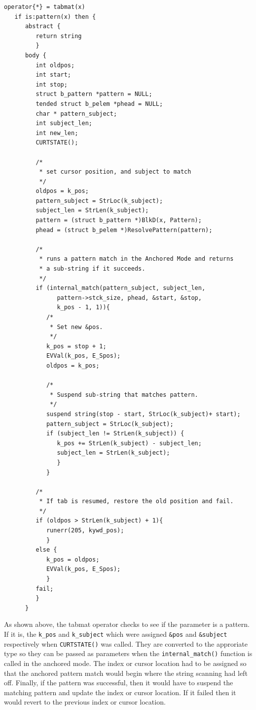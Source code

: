 \documentclass{article}
\begin{document}
\begin{verbatim}
operator{*} = tabmat(x)
   if is:pattern(x) then {
      abstract {
         return string
         }
      body {
         int oldpos;
         int start;
         int stop;
         struct b_pattern *pattern = NULL;
         tended struct b_pelem *phead = NULL; 
         char * pattern_subject;
         int subject_len;
         int new_len;
         CURTSTATE();
         
         /*
          * set cursor position, and subject to match
          */
         oldpos = k_pos;
         pattern_subject = StrLoc(k_subject);
         subject_len = StrLen(k_subject);
         pattern = (struct b_pattern *)BlkD(x, Pattern);
         phead = (struct b_pelem *)ResolvePattern(pattern);
         
         /*
          * runs a pattern match in the Anchored Mode and returns
          * a sub-string if it succeeds.
          */
         if (internal_match(pattern_subject, subject_len, 
               pattern->stck_size, phead, &start, &stop, 
               k_pos - 1, 1)){
            /*
             * Set new &pos.
             */ 
            k_pos = stop + 1;
            EVVal(k_pos, E_Spos);	
            oldpos = k_pos;
         
            /*
             * Suspend sub-string that matches pattern.
             */
            suspend string(stop - start, StrLoc(k_subject)+ start);
            pattern_subject = StrLoc(k_subject);
            if (subject_len != StrLen(k_subject)) {
               k_pos += StrLen(k_subject) - subject_len;
               subject_len = StrLen(k_subject);
               }
            }
            
         /*
          * If tab is resumed, restore the old position and fail.
          */
         if (oldpos > StrLen(k_subject) + 1){
            runerr(205, kywd_pos);
            } 
         else {
            k_pos = oldpos;
            EVVal(k_pos, E_Spos);
            }
         fail;
         }
      }
\end{verbatim}

As shown above, the tabmat operator checks to see if the parameter is a pattern.  If it is, the \texttt{k\_pos} and \texttt{k\_subject} which were assigned \texttt{\&pos} and \texttt{\&subject} respectively when \texttt{CURTSTATE()} was called.  They are converted to the approriate type so they can be passed as parameters when the \texttt{internal\_match()} function is called in the anchored mode.  The index or cursor location had to be assigned so that the anchored pattern match would begin where the string scanning had left off.  Finally, if the pattern was successful, then it would have to suspend the matching pattern and update the index or cursor location.  If it failed then it would revert to the previous index or cursor location.  
\end{document}

